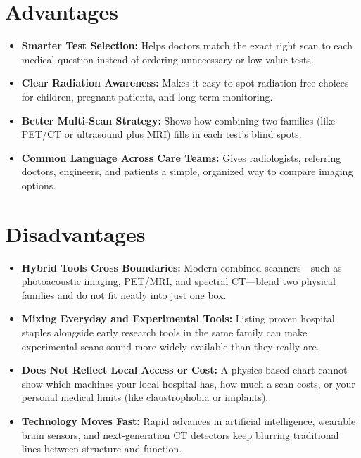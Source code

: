 \section{Advantages}
\begin{itemize}
  \item \textbf{Smarter Test Selection:} Helps doctors match the exact right scan to each medical question instead of ordering unnecessary or low-value tests.
  \item \textbf{Clear Radiation Awareness:} Makes it easy to spot radiation-free choices for children, pregnant patients, and long-term monitoring.
  \item \textbf{Better Multi-Scan Strategy:} Shows how combining two families (like PET/CT or ultrasound plus MRI) fills in each test's blind spots.
  \item \textbf{Common Language Across Care Teams:} Gives radiologists, referring doctors, engineers, and patients a simple, organized way to compare imaging options.
\end{itemize}

\section{Disadvantages}
\begin{itemize}
  \item \textbf{Hybrid Tools Cross Boundaries:} Modern combined scanners---such as photoacoustic imaging, PET/MRI, and spectral CT---blend two physical families and do not fit neatly into just one box.
  \item \textbf{Mixing Everyday and Experimental Tools:} Listing proven hospital staples alongside early research tools in the same family can make experimental scans sound more widely available than they really are.
  \item \textbf{Does Not Reflect Local Access or Cost:} A physics-based chart cannot show which machines your local hospital has, how much a scan costs, or your personal medical limits (like claustrophobia or implants).
  \item \textbf{Technology Moves Fast:} Rapid advances in artificial intelligence, wearable brain sensors, and next-generation CT detectors keep blurring traditional lines between structure and function.
\end{itemize}

